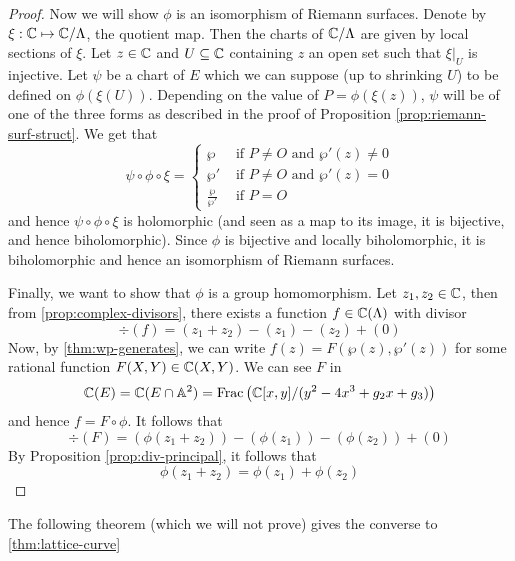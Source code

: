 \begin{proof}
	Now we will show $\phi$ is an isomorphism of Riemann surfaces.
	Denote by $\xi: \mathbb{C} \mapsto \mathbb{C}/\Lambda$, the quotient map.
	Then the charts of $\mathbb{C}/\Lambda$ are given by local sections of $\xi$.
	Let $z \in \mathbb{C}$ and $U \subseteq \mathbb{C}$ containing $z$ an open set such that 
	$\xi\vert_U$ is injective. Let $\psi$ be a chart of $E$
	which we can suppose (up to shrinking $U$) to be defined on
	$\phi(\xi(U))$.
	Depending on the value of $P = \phi(\xi(z))$, $\psi$ will be of one of the
	three forms as described in the proof of 
	Proposition \ref{prop:riemann-surf-struct}.
	We get that
	\begin{equation*}
		\psi\circ\phi\circ\xi = 
		\begin{cases}
			\wp &\textrm{ if } P \neq O\textrm{ and }\wp'(z) \neq 0\\
			\wp' &\textrm{ if } P \neq O\textrm{ and }\wp'(z) = 0\\
			\frac{\wp}{\wp'} &\textrm{ if }P = O
		\end{cases}
	\end{equation*}
	and hence $\psi\circ\phi\circ\xi$ is holomorphic (and seen as a map to its
	image, it is bijective, and hence biholomorphic). Since $\phi$ is
	bijective and locally biholomorphic, it is
	biholomorphic and hence an isomorphism of Riemann surfaces.
	
	Finally, we want to show that $\phi$ is a group homomorphism.
	Let $z_1, z_2 \in \mathbb{C}$, then from \ref{prop:complex-divisors}, there exists
	a function $f \in \mathbb{C}(\Lambda)$ with divisor
	\begin{equation*}
		\div(f) = (z_1 + z_2) - (z_1) - (z_2) + (0)
	\end{equation*}
	Now, by \ref{thm:wp-generates}, we can write $f(z) = F(\wp(z), \wp'(z))$ for
	some rational function $F(X, Y) \in \mathbb{C}(X, Y)$. We can see $F$ in
	\begin{equation*}
		\mathbb{C}(E) = \mathbb{C}(E\cap \mathbb{A}^2) = \operatorname{Frac}\left(\mathbb{C}[x, y]/(y^2 - 4x^3 + g_2x + g_3)\right)	
	\end{equation*}
	and hence $f = F \circ \phi$. It follows that
	\begin{equation*}
		\div (F) = (\phi(z_1 + z_2)) - (\phi(z_1)) - (\phi(z_2)) + (0)
	\end{equation*}
	By Proposition \ref{prop:div-principal}, it follows that
	\begin{equation*}
		\phi(z_1 + z_2) = \phi(z_1) + \phi(z_2)
	\end{equation*}
\end{proof}

The following theorem (which we will not prove) gives the converse to \ref{thm:lattice-curve}

